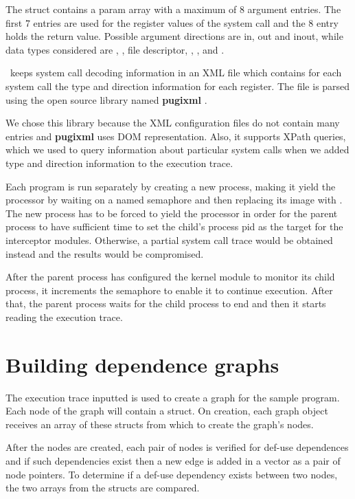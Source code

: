 The  struct contains a param array with a maximum of 8 argument entries. The first 7 entries are used for the register values of the system call and the 8 entry holds the return value.
Possible argument directions are  in, out and inout, while data types considered are , , file descriptor, , ,  and .

\project\ keeps system call decoding information in an XML file which contains for each system call the type and direction information for each register. The file is parsed using the open source library named \textbf{pugixml} \cite{pugixml-library}. 

We chose this library because the XML configuration files do not contain many entries and \textbf{pugixml} uses DOM representation. Also, it supports XPath queries, which we used to query information about particular system calls when we added type and direction information to the execution trace.


Each program is run separately by creating a new process, making it yield the processor by waiting on a named semaphore and then replacing its image with . The new process has to be forced to yield the processor in order for the parent process to have sufficient time to set the child’s process pid as the target for the interceptor modules. Otherwise, a partial system call trace would be obtained instead and the results would be compromised. 

After the parent process has configured the kernel module to monitor its child process, it increments the semaphore to enable it to continue execution. After that, the parent process waits for the child process to end and then it starts reading the execution trace.

\section{Building dependence graphs}
\label{fourth:dep-graphs}

The execution trace inputted is used to create a graph for the sample program. Each node of the graph will contain a  struct. On creation, each graph object receives an array of these structs from which to create the graph’s nodes.

After the nodes are created, each pair of nodes is verified for def-use dependences and if such dependencies exist then a new edge is added in a vector as a pair of node pointers. To determine if a def-use dependency exists between two nodes, the two  arrays from the  structs are compared.

